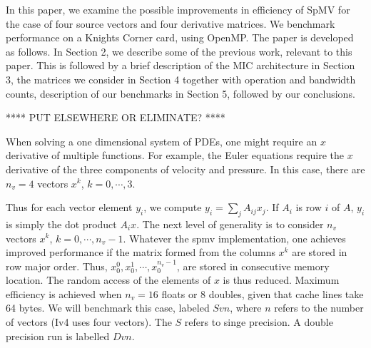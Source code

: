 In this paper, we examine the possible improvements in efficiency of SpMV for
the case of four source vectors and four derivative matrices. We benchmark
performance on a Knights Corner card\cite{}, using OpenMP. The paper 
is developed as follows. In Section 2, we describe some of the previous work, 
relevant to this paper. This is followed by a brief description of the MIC
architecture in Section 3, the matrices we consider in Section 4 together 
with operation and bandwidth counts, description of our benchmarks in Section 5, 
followed by our conclusions. 





**** PUT ELSEWHERE OR ELIMINATE? ****

When solving a one dimensional system of PDEs, one might require an $x$ derivative of multiple functions. For example, the Euler equations require the $x$ derivative of the three components of velocity and pressure. In this case, there are $n_v=4$ vectors $x^k$, $k=0,\cdots,3$. 

Thus for each vector element $y_i$, we compute $y_i = \sum_j A_{ij} x_j$. If $A_i$ is row $i$ of $A$, $y_i$ is simply the dot product $A_i x$. The next level of generality is to consider $n_v$ vectors $x^k$, $k=0,\cdots,n_v-1$. Whatever the spmv implementation, one achieves improved performance if the matrix formed from the columns $x^k$ are stored in row major order. Thus, $x^0_0,x^1_0,\cdots,x^{n_v-1}_0$, are stored in consecutive memory location. The random access of the elements of $x$ is thus reduced. Maximum efficiency is achieved when $n_v=16$ floats or $8$ doubles, given that cache lines take 64 bytes. We will benchmark this case, labeled $Svn$, where $n$ refers to the number of vectors (Iv4 uses four vectors). The $S$ refers to singe precision. A double precision run is labelled $Dvn$. 

